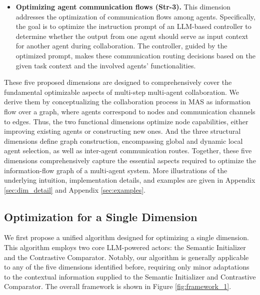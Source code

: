 \begin{itemize}[leftmargin=*]
    \item \noindent \textbf{Optimizing agent communication flows  (Str-3).} This dimension addresses the optimization of communication flows among agents. Specifically, the goal is to optimize the instruction prompt of an LLM-based controller to determine whether the output from one agent should serve as input context for another agent during collaboration. The controller, guided by the optimized prompt, makes these communication routing decisions based on the given task context and the involved agents' functionalities.
    
\end{itemize}


These five proposed dimensions are designed to comprehensively cover the fundamental optimizable aspects of multi-step multi-agent collaboration.  We derive them by conceptualizing the collaboration process in MAS as information flow over a graph, where agents correspond to nodes and communication channels to edges.
Thus, the two functional dimensions optimize node capabilities, either improving existing agents or constructing new ones. And the three structural dimensions define graph construction, encompassing global and dynamic local agent selection, as well as inter-agent communication routes. Together, these five dimensions comprehensively capture the essential aspects required to optimize the information-flow graph of a multi-agent system.
More illustrations of the underlying intuition, implementation details, and examples are given in Appendix \ref{sec:dim_detail} and Appendix \ref{sec:examples}.






\subsection{Optimization for a Single Dimension} \label{sec:indi_opt}

We first propose a unified algorithm designed for optimizing a single dimension. This algorithm employs two core LLM-powered actors: the Semantic Initializer and the Contrastive Comparator. Notably, our algorithm is generally applicable to any of the five dimensions identified before, requiring only minor adaptations to the contextual information supplied to the Semantic Initializer and Contrastive Comparator. The overall framework is shown in Figure \ref{fig:framework_1}.


